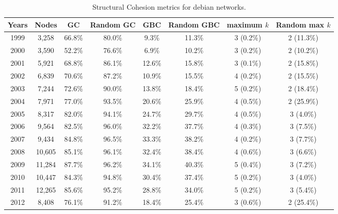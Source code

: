 \begin{table}[H]
\begin{center}
\begin{tabular}{|c|c|c|c|c|c|c|c|}
\hline
Years&Nodes&GC&Random GC&GBC&Random GBC&maximum $k$&Random max $k$\\
\hline
1999&3,258&66.8\%&80.0\%&9.3\%&11.3\%&3 (0.2\%)&2 (11.3\%)\\
2000&3,590&52.2\%&76.6\%&6.9\%&10.2\%&3 (0.2\%)&2 (10.2\%)\\
2001&5,921&68.8\%&86.1\%&12.6\%&15.8\%&3 (0.1\%)&2 (15.8\%)\\
2002&6,839&70.6\%&87.2\%&10.9\%&15.5\%&4 (0.2\%)&2 (15.5\%)\\
2003&7,244&72.6\%&90.0\%&13.8\%&18.4\%&5 (0.2\%)&2 (18.4\%)\\
2004&7,971&77.0\%&93.5\%&20.6\%&25.9\%&4 (0.5\%)&2 (25.9\%)\\
2005&8,317&82.0\%&94.1\%&24.7\%&29.7\%&4 (0.5\%)&3 (4.0\%)\\
2006&9,564&82.5\%&96.0\%&32.2\%&37.7\%&4 (0.3\%)&3 (7.5\%)\\
2007&9,434&84.8\%&96.5\%&33.3\%&38.2\%&4 (0.2\%)&3 (7.7\%)\\
2008&10,605&85.1\%&96.1\%&32.4\%&38.4\%&4 (0.6\%)&3 (6.6\%)\\
2009&11,284&87.7\%&96.2\%&34.1\%&40.3\%&5 (0.4\%)&3 (7.2\%)\\
2010&10,447&84.3\%&94.8\%&30.4\%&37.4\%&5 (0.2\%)&3 (4.0\%)\\
2011&12,265&85.6\%&95.2\%&28.8\%&34.0\%&5 (0.2\%)&3 (5.4\%)\\
2012&8,408&76.1\%&91.2\%&18.4\%&25.4\%&3 (0.6\%)&2 (25.4\%)\\
\hline
\end{tabular}
\caption{Structural Cohesion metrics for debian networks.}
\label{str_cohesion_debian}
\end{center}
\end{table}

